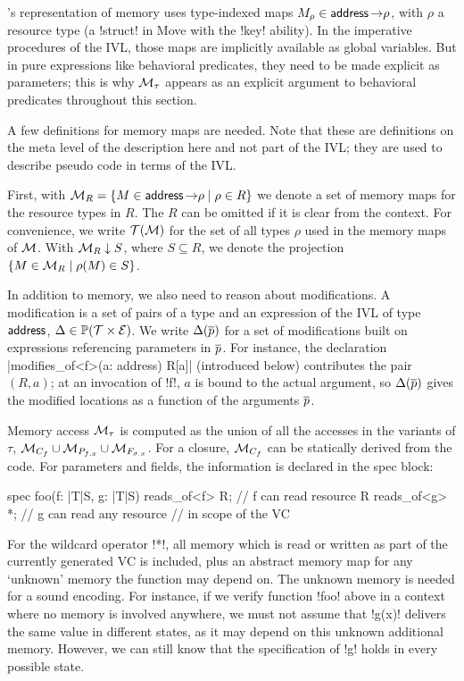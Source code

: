 \MVP's representation of memory uses type-indexed maps $M_\rho \in \mathop{\mathstrut{\mathsf{address}}}\nolimits \mathbin{\rightarrow} \rho$, with $\rho$ a resource type (a !struct! in Move with the !key! ability).
In the imperative procedures of the IVL, those maps are implicitly available as global variables.
But in pure expressions like behavioral predicates, they need to be made explicit as parameters; this is why $\mathcal{M}_\tau$ appears as an explicit argument to behavioral predicates throughout this section.

A few definitions for memory maps are needed.
Note that these are definitions on the meta level of the description here and not part of the IVL; they are used to describe pseudo code in terms of the IVL.

First, with $\mathcal{M}_R = \{ M \in \mathop{\mathstrut{\mathsf{address}}}\nolimits \mathbin{\rightarrow} \rho \mid \rho \in R\}$ we denote a set of memory maps for the resource types in $R$.
The $R$ can be omitted if it is clear from the context. For convenience, we write $\mathcal{T}(\mathcal{M})$ for the set of all types $\rho$ used in the memory maps of $\mathcal{M}$.
With $\mathcal{M}_R \downarrow S$, where $S \subseteq R$, we denote the projection $\{ M \in \mathcal{M}_R \mid \rho(M) \in S \}$.

In addition to memory, we also need to reason about modifications.
A modification is a set of pairs of a type and an expression of the IVL of type $\mathop{\mathstrut{\mathsf{address}}}\nolimits$, $\Delta \in \mathop{\mathstrut{\mathbb P}}\nolimits (\mathcal{T} \times \mathcal{E})$.
We write $\Delta(\overline{p})$ for a set of modifications built on expressions referencing parameters in $\overline{p}$.
For instance, the declaration |modifies_of<f>(a: address) R[a]| (introduced below) contributes the pair $(R, a)$; at an invocation of !f!, $a$ is bound to the actual argument, so $\Delta(\overline{p})$ gives the modified locations as a function of the arguments $\overline{p}$.


Memory access $\mathcal{M}_\tau$ is computed as the union of all the accesses in the variants of $\tau$, $\mathcal{M}_{C_f} \cup \mathcal{M}_{P_{f,x}} \cup \mathcal{M}_{F_{\sigma.x}}$.
For a closure, $\mathcal{M}_{C_f}$  can be statically derived from the code.
For parameters and fields, the information is declared in the spec block:

\begin{MoveBox}
  spec foo(f: |T|S, g: |T|S) {
    reads_of<f> R; // f can read resource R
    reads_of<g> *; // g can read any resource
                   // in scope of the VC
  }
\end{MoveBox}

\noindent For the wildcard operator !*!, all memory which is read or written as part of the currently generated VC is included, plus an abstract memory map for any `unknown' memory the function may depend on.
The unknown memory is needed for a sound encoding.
For instance, if we verify function !foo! above in a context where no memory is involved anywhere, we must not assume that !g(x)! delivers the same value in different states, as it may depend on this unknown additional memory.
However, we can still know that the specification of !g! holds in every possible state.

